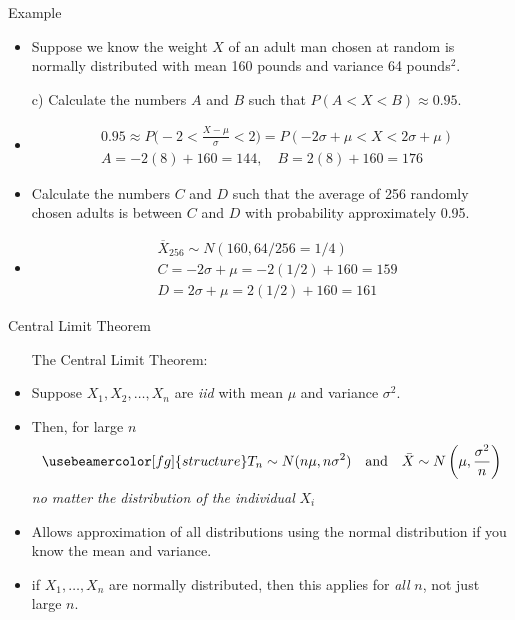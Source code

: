 \documentclass[10pt, xcolor=table]{beamer}
\newcommand*\themecol{\usebeamercolor[fg]{structure}}
\begin{document}
\begin{frame}{Example}
\begin{itemize}
\item Suppose we know the weight $X$ of an adult man chosen at random is normally distributed with mean 160 pounds and variance 64 pounds$^2$. \\[10pt]
\item[c)] Calculate the numbers $A$ and $B$ such that $P(A < X < B) \approx 0.95$.
\item<2->[] {\color{red} 
\vspace*{-0.25cm}
\begin{align*}
&0.95 \approx P\bigg(-2 < \frac{X-\mu}{\sigma} < 2\bigg) = P(-2\sigma + \mu < X < 2\sigma + \mu) \\
&A = -2(8) + 160 = 144,  \quad B = 2(8) + 160 = 176
\end{align*}}
\vspace*{-0.25cm}
\item<3->[d)] Calculate the numbers $C$ and $D$ such that the average of 256 randomly chosen adults is between $C$ and $D$ with probability approximately 0.95.
\item<4->[] {\color{red}
\vspace*{-0.5cm}
\begin{align*}
&\overline{X}_{256} \sim N(160, 64/256 = 1/4) \\
&C = -2\sigma + \mu = -2(1/2) + 160 = 159 \\
&D = 2\sigma + \mu = 2(1/2) + 160 = 161
\end{align*}}
\vspace*{-0.25cm}
\end{itemize}
\end{frame}

\begin{frame}{Central Limit Theorem}
\begin{itemize}
\setlength{\itemsep}{15pt}
\item[] {\themecol The Central Limit Theorem:}
\item Suppose $X_1, X_2, \dots, X_n$ are \emph{iid} with mean $\mu$ and variance $\sigma^2$. 
\item Then, for large $n$
\begin{align*}
\themecol T_n \sim N(n\mu, n\sigma^2)\quad \text{and} \quad \bar{X} \sim N\left(\mu, \frac{\sigma^2}{n}\right)
\end{align*}
{\centering \emph{no matter the distribution of the individual} $X_i$}
\item Allows approximation of all distributions using the normal distribution if you know the mean and variance.
\item<2->[Note:] \small if $X_1, \dots, X_n$ are normally distributed, then this applies for \emph{all} $n$, not just large $n$.
\end{itemize}
\end{frame}
\end{document}
